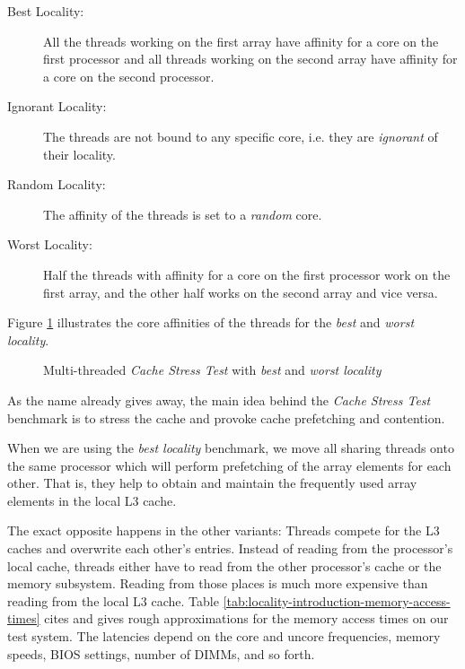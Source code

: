 \begin{description}
\item[Best Locality:] All the threads working on the first array have
  affinity for a core on the first processor and all threads working
  on the second array have affinity for a core on the second
  processor.
\item[Ignorant Locality:] The threads are not bound to any specific
  core, i.e. they are \emph{ignorant} of their locality.
\item[Random Locality:] The affinity of the threads is set to a
  \emph{random} core.
\item[Worst Locality:] Half the threads with affinity for a core on
  the first processor work on the first array, and the other half
  works on the second array and vice versa.
\end{description}

Figure \ref{fig:locality-approach-cache-stress-test-mafushi}
illustrates the core affinities of the threads for the \emph{best} and
\emph{worst locality}.

\begin{figure}[!ht]
  \centering
  \caption{Multi-threaded \emph{Cache Stress Test} with \emph{best}
    and \emph{worst locality}}
  \label{fig:locality-approach-cache-stress-test-mafushi}
\end{figure}

As the name already gives away, the main idea behind the \emph{Cache
  Stress Test} benchmark is to stress the cache and provoke cache
prefetching and contention.

When we are using the \emph{best locality} benchmark, we move all
sharing threads onto the same processor which will perform prefetching
of the array elements for each other. That is, they help to obtain and
maintain the frequently used array elements in the local L3 cache.

The exact opposite happens in the other variants: Threads compete for
the L3 caches and overwrite each other's entries. Instead of reading
from the processor's local cache, threads either have to read from the
other processor's cache or the memory subsystem. Reading from those
places is much more expensive than reading from the local L3
cache. Table \ref{tab:locality-introduction-memory-access-times} cites
\textcite{Levinthal2009} and gives rough approximations for the memory
access times on our test system. The latencies depend on the core and
uncore frequencies, memory speeds, BIOS settings, number of DIMMs, and
so forth.

